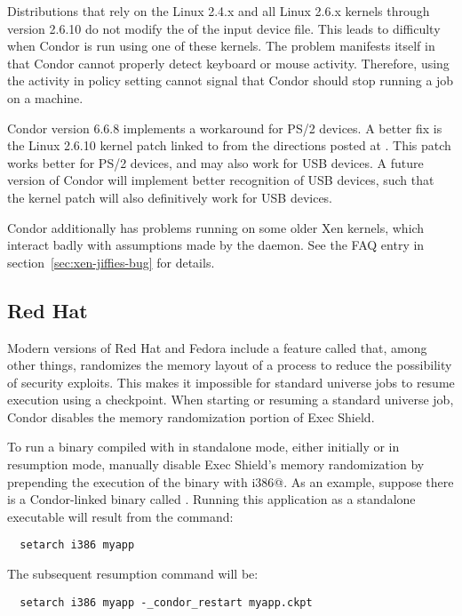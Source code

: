 Distributions that rely on the Linux 2.4.x and all Linux 2.6.x kernels
through version 2.6.10
do not modify the  of the input device file.
This leads to difficulty when Condor is run using one of these
kernels. 
The problem manifests itself in that Condor cannot properly
detect keyboard or mouse activity.
Therefore, using the activity in policy setting cannot
signal that Condor should stop running a job on a machine.

Condor version 6.6.8 implements a workaround for PS/2 devices.
A better fix is the Linux 2.6.10 kernel
patch linked to from the directions posted at
.
This patch works better for PS/2 devices, and
may also work for USB devices.
A future version of Condor will implement better recognition
of USB devices,
such that the kernel patch will also definitively work for USB devices.

Condor additionally has problems running on some older Xen kernels,
which interact badly with assumptions made by the 
daemon. See the FAQ entry in section~\ref{sec:xen-jiffies-bug} for
details.

\subsection{\label{sec:platform-linux-redhat}Red Hat}

Modern versions of Red Hat and Fedora include a feature called
 that, among other things, randomizes the memory
layout of a process
to reduce the possibility of security exploits. This makes it impossible
for standard universe jobs to resume execution using a checkpoint.
When starting
or resuming a standard universe job, Condor disables the memory
randomization portion of Exec Shield.

To run a binary compiled with   in standalone mode,
either initially or in resumption mode, manually disable
Exec Shield's memory randomization by prepending the execution
of the binary with \verb@setarch i386@.
As an example, suppose there is a
Condor-linked binary called .
Running this application as a
standalone executable will result from the command:
\begin{verbatim}
  setarch i386 myapp
\end{verbatim}
The subsequent resumption command will be: 
\begin{verbatim}
  setarch i386 myapp -_condor_restart myapp.ckpt
\end{verbatim}


